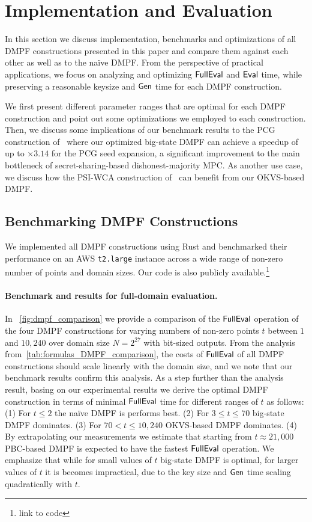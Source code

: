 \section{Implementation and Evaluation}\label{sec:implementation}
In this section we discuss implementation, benchmarks and optimizations of all DMPF constructions presented in this paper and compare them against each other as well as to the na\"{i}ve DMPF. From the perspective of practical applications, we focus on analyzing and optimizing ${\sf FullEval}$ and ${\sf Eval}$ time, while preserving a reasonable keysize and ${\sf Gen}$ time for each DMPF construction. 

We first present different parameter ranges that are optimal for each DMPF construction and point out some optimizations we employed to each construction. 
Then, we discuss some implications of our benchmark results to the PCG construction of~\cite{foleage} 
where our optimized big-state DMPF can achieve a speedup of up to $\times 3.14$ for the PCG seed expansion, a significant improvement to the main bottleneck of secret-sharing-based dishonest-majority MPC.
As another use case, we discuss how the PSI-WCA construction of~\cite{cryptoeprint:2020/1599}
can benefit from our OKVS-based DMPF.

\subsection{Benchmarking DMPF Constructions}
We implemented all DMPF constructions using Rust and benchmarked their performance on an AWS {\tt t2.large} instance across a wide range of non-zero number of points and domain sizes.
Our code is also publicly available.\footnote{link to code}

\paragraph{Benchmark and results for full-domain evaluation.}
In ~\cref{fig:dmpf_comparison} we provide a comparison of the ${\sf FullEval}$ operation of the four DMPF constructions for varying numbers of non-zero points $t$ between $1$ and $10,240$ over domain size $N=2^{27}$ with bit-sized outputs.
From the analysis from~\cref{tab:formulas_DMPF_comparison}, the costs of ${\sf FullEval}$ of all DMPF constructions should scale linearly with the domain size, and we note that our benchmark results confirm this analysis.
As a step further than the analysis result, basing on our experimental results we derive the optimal DMPF construction in terms of minimal ${\sf FullEval}$ time for different ranges of $t$ as follows: (1) For $t\leq 2$ the na\"ive DMPF is performs best. (2) For $3\leq t \leq 70$ big-state DMPF dominates. (3) For $70<t\leq 10,240$ OKVS-based DMPF dominates. (4) By extrapolating our measurements we estimate that starting from $t\approx 21,000$ PBC-based DMPF is expected to have the fastest ${\sf FullEval}$ operation.
We emphasize that while for small values of $t$ big-state DMPF is optimal, for larger values of $t$ it is becomes impractical, due to the key size and ${\sf Gen}$ time scaling quadratically with $t$.

